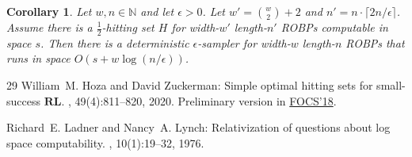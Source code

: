 \documentclass[10pt,a4paper]{article}
\newtheorem{corollary}[theorem]{Corollary}
\newcommand{\N}{\mathbb N}
\begin{document}
\begin{corollary} \label{cor:const-width-main-generalization}
Let $w, n \in \N$ and let $\epsilon > 0$. Let $w' = \binom{w}{2} + 2$ and $n' = n \cdot \lceil 2n / \epsilon \rceil$. Assume there is a $\frac{1}{2}$-hitting set $H$ for width-$w'$ length-$n'$ ROBPs computable in space $s$. Then there is a deterministic $\epsilon$-sampler for width-$w$ length-$n$ ROBPs that runs in space $O(s + w \log(n/\epsilon))$.
\end{corollary}

\begin{thebibliography}{29}
{\sc William~M. Hoza and David Zuckerman}: Simple optimal hitting sets for
  small-success {$\mathbf{RL}$}.
, 49(4):811--820, 2020.
\newblock Preliminary version in \href{https://doi.org/10.1109/FOCS.2018.00015}{FOCS'18}.

{\sc Richard~E. Ladner and Nancy~A. Lynch}: Relativization of questions about
  log space computability.
, 10(1):19--32, 1976.

\end{thebibliography}
\end{document}
